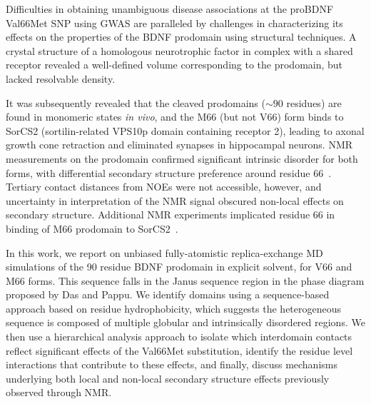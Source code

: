 \documentclass[10pt,letterpaper]{article}
\begin{document}
Difficulties in obtaining unambiguous disease associations at the proBDNF Val66Met SNP using GWAS are paralleled by challenges in characterizing its effects on the properties of the BDNF prodomain using structural techniques. A crystal structure of a homologous neurotrophic factor in complex with a shared receptor revealed a well-defined volume corresponding to the prodomain, but lacked resolvable density\cite{Feng2010a}.

It was subsequently revealed that the cleaved prodomains ($\sim90$ residues) are found in monomeric states {\it in vivo}, and the M66 (but not V66) form binds to SorCS2 (sortilin-related VPS10p domain containing receptor 2), leading to axonal growth cone retraction\cite{Anastasia2013} and eliminated synapses in hippocampal neurons\cite{Giza2018}. NMR measurements on the prodomain confirmed significant intrinsic disorder for both forms, with differential secondary structure preference around residue 66~\cite{Anastasia2013}. Tertiary contact distances from NOEs were not accessible, however, and uncertainty in interpretation of the NMR signal obscured non-local effects on secondary structure. Additional NMR experiments implicated residue 66 in binding of M66 prodomain to SorCS2~\cite{Anastasia2013}.
 

In this work, we report on unbiased fully-atomistic replica-exchange MD simulations of the 90 residue BDNF prodomain in explicit solvent, for V66 and M66 forms. This sequence falls in the Janus sequence region in the phase diagram proposed by Das and Pappu\cite{Das2015,Das2013a}. We identify domains using a sequence-based approach based on residue hydrophobicity, which suggests the heterogeneous sequence is composed of multiple globular and intrinsically disordered regions. We then use a hierarchical analysis approach to isolate which interdomain contacts reflect significant effects of the Val66Met substitution, identify the residue level interactions that contribute to these effects, and finally, discuss mechanisms underlying both local and non-local secondary structure effects previously observed through NMR.
\end{document}
